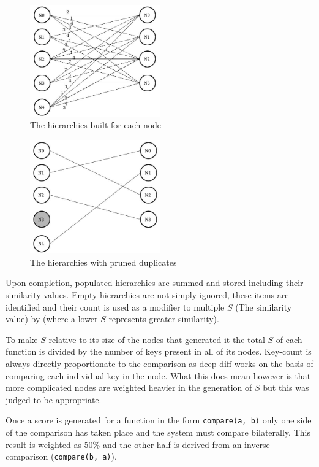 \documentclass[jou,apacite]{apa6}
\begin{document}
\begin{figure}[h]
\caption{The hierarchies built for each node}
\centering
\includegraphics[width=0.50\textwidth]{allhierarchies}
\end{figure}

\begin{figure}[h]
\caption{The hierarchies with pruned duplicates}
\centering
\includegraphics[width=0.50\textwidth]{hierarchies}
\end{figure}

Upon completion, populated hierarchies are summed and stored including their similarity values. Empty hierarchies are not simply ignored, these items are identified and their count is used as a modifier to multiple $S$ (The similarity value) by (where a lower $S$ represents greater similarity).  

To make $S$ relative to its size of the nodes that generated it the total $S$ of each function is divided by the number of keys present in all of its nodes. Key-count is always directly proportionate to the comparison as deep-diff works on the basis of comparing each individual key in the node. What this does mean however is that more complicated nodes are weighted heavier in the generation of $S$ but this was judged to be appropriate.

Once a score is generated for a function in the form \texttt{compare(a, b)} only one side of the comparison has taken place and the system must compare bilaterally. This result is weighted as 50\% and the other half is derived from an inverse comparison (\texttt{compare(b, a)}).
\end{document}
